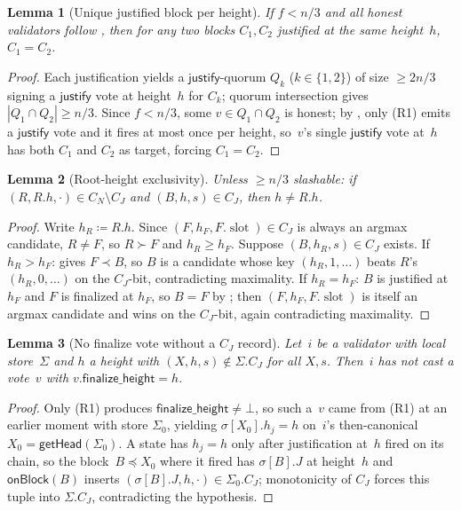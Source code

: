 \documentclass{article}
\newcommand{\slot}[0]{\ensuremath{\operatorname{\mathrm{slot}}}}
\newcommand{\just}{\ensuremath{\mathsf{justify}}\xspace}
\newcommand{\finalizeHeight}{\mathsf{finalize\_height}}
\newcommand{\onBlock}{\textsf{onBlock}\xspace}
\newcommand{\getHead}{\textsf{getHead}\xspace}
\theoremstyle{plain}
\newtheorem{lemma}{Lemma}
\theoremstyle{definition}
\theoremstyle{remark}
\begin{document}
\begin{lemma}[Unique justified block per height]\label{rev:lem:unique-just-per-height}
If $f < n/3$ and all honest validators follow , then for any two blocks $C_1, C_2$ justified at the same height~$h$, $C_1 = C_2$.
\end{lemma}

\begin{proof}
Each justification yields a \just-quorum $Q_k$ ($k \in \{1,2\}$) of size $\geq 2n/3$ signing a \just vote at height~$h$ for $C_k$; quorum intersection gives $|Q_1 \cap Q_2| \geq n/3$.
Since $f < n/3$, some $v \in Q_1 \cap Q_2$ is honest; by , only (R1) emits a \just vote and it fires at most once per height, so~$v$'s single \just vote at~$h$ has both $C_1$ and $C_2$ as target, forcing $C_1 = C_2$.
\end{proof}

\begin{lemma}[Root-height exclusivity]\label{rev:lem:root-height-cj-exclusive}
Unless $\geq n/3$ slashable: if $(R, R.h, \cdot) \in C_N \setminus C_J$ and $(B, h, s) \in C_J$, then $h \neq R.h$.
\end{lemma}

\begin{proof}
Write $h_R \coloneqq R.h$. Since $(F, h_{F}, F.\slot) \in C_J$ is always an argmax candidate, $R \neq F$, so $R \succ F$ and $h_R \geq h_{F}$.
Suppose $(B, h_R, s) \in C_J$ exists.
If $h_R > h_{F}$:  gives $F \prec B$, so $B$ is a candidate whose key $(h_R, 1, \ldots)$ beats $R$'s $(h_R, 0, \ldots)$ on the $C_J$-bit, contradicting maximality.
If $h_R = h_{F}$: $B$ is justified at $h_{F}$ and $F$ is finalized at $h_{F}$, so $B = F$ by ; then $(F, h_{F}, F.\slot)$ is itself an argmax candidate and wins on the $C_J$-bit, again contradicting maximality.
\end{proof}

\begin{lemma}[No finalize vote without a $C_J$ record]\label{rev:lem:no-finalize-without-cj}
Let~$i$ be a validator with local store~$\Sigma$ and $h$ a height with $(X, h, s) \notin \Sigma.C_J$ for all $X, s$. Then~$i$ has not cast a vote~$v$ with $v.\finalizeHeight = h$.
\end{lemma}

\begin{proof}
Only (R1) produces $\finalizeHeight \neq \bot$, so such a~$v$ came from (R1) at an earlier moment with store $\Sigma_0$, yielding $\sigma[X_0].h_j = h$ on~$i$'s then-canonical $X_0 = \getHead(\Sigma_0)$.
A state has $h_j = h$ only after justification at~$h$ fired on its chain, so the block~$B \preceq X_0$ where it fired has $\sigma[B].J$ at height~$h$ and $\onBlock(B)$ inserts $(\sigma[B].J, h, \cdot) \in \Sigma_0.C_J$; monotonicity of $C_J$ forces this tuple into $\Sigma.C_J$, contradicting the hypothesis.
\end{proof}
\end{document}
